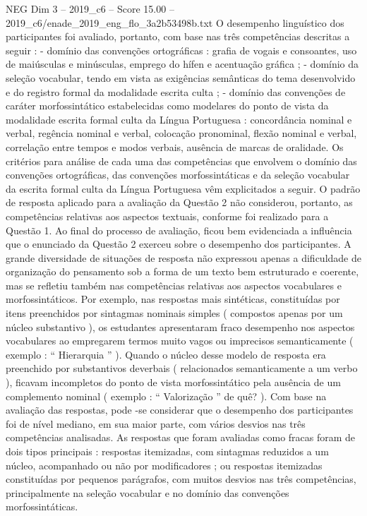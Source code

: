 \begin{textsample}{NEG Dim 3 – 2019\_c6 – Score 15.00 – 2019\_c6/enade\_2019\_eng\_flo\_3a2b53498b.txt}
O desempenho linguístico dos participantes foi avaliado, portanto, com base nas três competências descritas a seguir : - domínio das convenções ortográficas : grafia de vogais e consoantes, uso de maiúsculas e minúsculas, emprego do hífen e acentuação gráfica ; - domínio da seleção vocabular, tendo em vista as exigências semânticas do tema desenvolvido e do registro formal da modalidade escrita culta ; - domínio das convenções de caráter morfossintático estabelecidas como modelares do ponto de vista da modalidade escrita formal culta da Língua Portuguesa : concordância nominal e verbal, regência nominal e verbal, colocação pronominal, flexão nominal e verbal, correlação entre tempos e modos verbais, ausência de marcas de oralidade.
Os critérios para análise de cada uma das competências que envolvem o domínio das convenções ortográficas, das convenções morfossintáticas e da seleção vocabular da escrita formal culta da Língua Portuguesa vêm explicitados a seguir.
O padrão de resposta aplicado para a avaliação da Questão 2 não considerou, portanto, as competências relativas aos aspectos textuais, conforme foi realizado para a Questão 1.
Ao final do processo de avaliação, ficou bem evidenciada a influência que o enunciado da Questão 2 exerceu sobre o desempenho dos participantes.
A grande diversidade de situações de resposta não expressou apenas a dificuldade de organização do pensamento sob a forma de um texto bem estruturado e coerente, mas se refletiu também nas competências relativas aos aspectos vocabulares e morfossintáticos.
Por exemplo, nas respostas mais sintéticas, constituídas por itens preenchidos por sintagmas nominais simples ( compostos apenas por um núcleo substantivo ), os estudantes apresentaram fraco desempenho nos aspectos vocabulares ao empregarem termos muito vagos ou imprecisos semanticamente ( exemplo : “ Hierarquia ” ).
Quando o núcleo desse modelo de resposta era preenchido por substantivos deverbais ( relacionados semanticamente a um verbo ), ficavam incompletos do ponto de vista morfossintático pela ausência de um complemento nominal ( exemplo : “ Valorização ” de quê? ).
Com base na avaliação das respostas, pode -se considerar que o desempenho dos participantes foi de nível mediano, em sua maior parte, com vários desvios nas três competências analisadas.
As respostas que foram avaliadas como fracas foram de dois tipos principais : respostas itemizadas, com sintagmas reduzidos a um núcleo, acompanhado ou não por modificadores ; ou respostas itemizadas constituídas por pequenos parágrafos, com muitos desvios nas três competências, principalmente na seleção vocabular e no domínio das convenções morfossintáticas.

\end{textsample}
